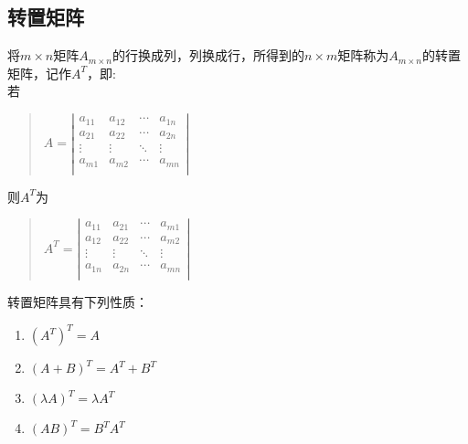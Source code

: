 \documentclass[a4paper,10pt]{article}
\begin{document}
\begin{CJK}{UTF8}{song}
\subsection{转置矩阵}
将$m\times{}n$矩阵$A_{m\times{}n}$的行换成列，列换成行，所得到的$n\times{}m$矩阵称为$A_{m\times{}n}$的转置矩阵，记作$A^{T}$，即: \\
若
\begin{quote}
$A=\left|\begin{array}{cccc}
a_{11}&a_{12}&\cdots{}&a_{1n} \\
a_{21}&a_{22}&\cdots{}&a_{2n} \\
\vdots&\vdots&\ddots{}&\vdots \\
a_{m1}&a_{m2}&\cdots{}&a_{mn} \\          
\end{array}\right| $
\end{quote}
则$A^{T}$为
\begin{quote}
$A^{T}=\left|\begin{array}{cccc}
a_{11}&a_{21}&\cdots{}&a_{m1} \\
a_{12}&a_{22}&\cdots{}&a_{m2} \\
\vdots&\vdots&\ddots{}&\vdots \\
a_{1n}&a_{2n}&\cdots{}&a_{mn} \\          
\end{array}\right| $
\end{quote}
转置矩阵具有下列性质：
\begin{enumerate}
\item $(A^{T})^{T}=A$
\item $(A+B)^{T}=A^{T}+B^{T}$
\item $(\lambda{}A)^{T}=\lambda{}A^{T}$
\item $(AB)^T=B^{T}A^{T}$
\end{enumerate}








































\end{CJK}
\end{document}
